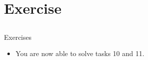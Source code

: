 \section{Exercise}
\subsection{}
\begin{frame}{Exercises}
	\begin{itemize}
		\item You are now able to solve tasks 10 and 11.
	\end{itemize}
\end{frame}

